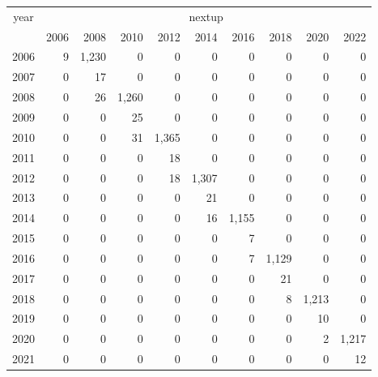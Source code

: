 \footnotesize\begin{tabular}[t]{lrrrrrrrrr}
\toprule
\multicolumn{1}{c}{year} & \multicolumn{9}{c}{nextup} \\
\cmidrule(l{3pt}r{3pt}){1-1} \cmidrule(l{3pt}r{3pt}){2-10}
  & 2006 & 2008 & 2010 & 2012 & 2014 & 2016 & 2018 & 2020 & 2022\\
\midrule
2006 & 9 & 1,230 & 0 & 0 & 0 & 0 & 0 & 0 & 0\\
2007 & 0 & 17 & 0 & 0 & 0 & 0 & 0 & 0 & 0\\
2008 & 0 & 26 & 1,260 & 0 & 0 & 0 & 0 & 0 & 0\\
2009 & 0 & 0 & 25 & 0 & 0 & 0 & 0 & 0 & 0\\
2010 & 0 & 0 & 31 & 1,365 & 0 & 0 & 0 & 0 & 0\\
2011 & 0 & 0 & 0 & 18 & 0 & 0 & 0 & 0 & 0\\
2012 & 0 & 0 & 0 & 18 & 1,307 & 0 & 0 & 0 & 0\\
2013 & 0 & 0 & 0 & 0 & 21 & 0 & 0 & 0 & 0\\
2014 & 0 & 0 & 0 & 0 & 16 & 1,155 & 0 & 0 & 0\\
2015 & 0 & 0 & 0 & 0 & 0 & 7 & 0 & 0 & 0\\
2016 & 0 & 0 & 0 & 0 & 0 & 7 & 1,129 & 0 & 0\\
2017 & 0 & 0 & 0 & 0 & 0 & 0 & 21 & 0 & 0\\
2018 & 0 & 0 & 0 & 0 & 0 & 0 & 8 & 1,213 & 0\\
2019 & 0 & 0 & 0 & 0 & 0 & 0 & 0 & 10 & 0\\
2020 & 0 & 0 & 0 & 0 & 0 & 0 & 0 & 2 & 1,217\\
2021 & 0 & 0 & 0 & 0 & 0 & 0 & 0 & 0 & 12\\
\bottomrule
\end{tabular}

